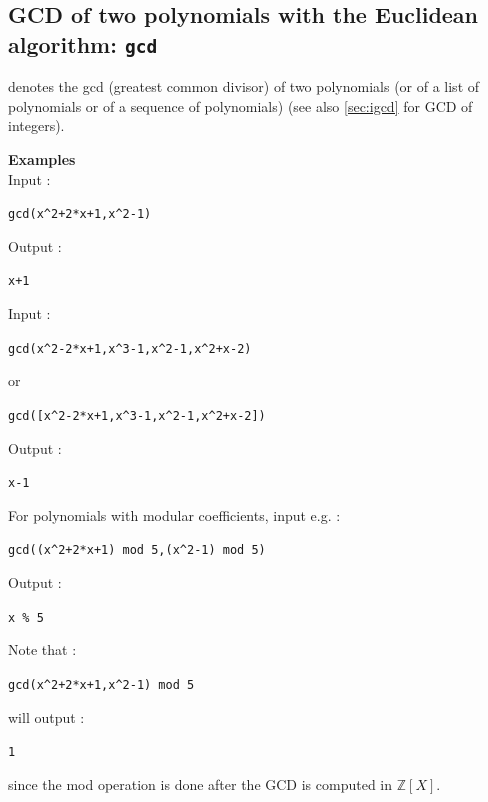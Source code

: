 \documentclass[a4paper,11pt]{book}
\newcommand{\Z}{{\mathbb{Z}}}
\begin{document}
\subsection{GCD of two polynomials with the Euclidean algorithm: {\tt gcd}}\label{sec:gcd}
 denotes the gcd (greatest common divisor) of two polynomials
(or of a list of polynomials or of a sequence of polynomials) 
(see also \ref{sec:igcd} for GCD of integers).

{\bf Examples}\\ 
Input :
\begin{center}{\tt gcd(x\verb|^|2+2*x+1,x\verb|^|2-1)}\end{center}
Output :
\begin{center}{\tt x+1 }\end{center} 
Input :
\begin{center}{\tt gcd(x\verb|^|2-2*x+1,x\verb|^|3-1,x\verb|^|2-1,x\verb|^|2+x-2)}\end{center}
or
\begin{center}{\tt gcd([x\verb|^|2-2*x+1,x\verb|^|3-1,x\verb|^|2-1,x\verb|^|2+x-2])}\end{center}
Output :
\begin{center}{\tt x-1}\end{center}

For polynomials with modular coefficients, input e.g. :
\begin{center}{\tt gcd((x\verb|^|2+2*x+1) mod 5,(x\verb|^|2-1) mod 5)}\end{center} 
Output :
\begin{center}{\tt x \% 5}\end{center}
Note that :
\begin{center}{\tt gcd(x\verb|^|2+2*x+1,x\verb|^|2-1) mod 5}\end{center} 
will output :
\begin{center}{\tt 1}\end{center}
since the mod operation is done after the GCD is computed in $\Z[X]$.
\end{document}
